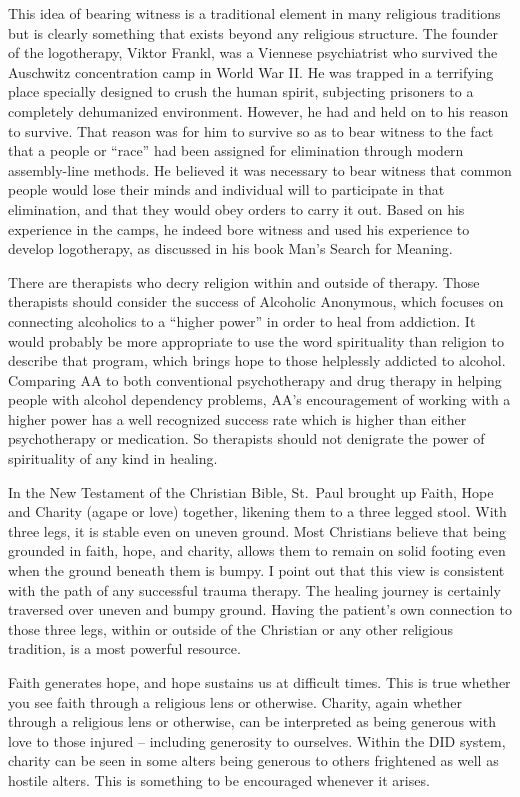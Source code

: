 \documentclass[]{book}
\begin{document}
This idea of bearing witness is a traditional element in many religious traditions but is clearly something that exists beyond any religious structure. The founder of the logotherapy, Viktor Frankl, was a Viennese psychiatrist who survived the Auschwitz concentration camp in World War II. He was trapped in a terrifying place specially designed to crush the human spirit, subjecting prisoners to a completely dehumanized environment. However, he had and held on to his reason to survive. That reason was for him to survive so as to bear witness to the fact that a people or ``race'' had been assigned for elimination through modern assembly-line methods. He believed it was necessary to bear witness that common people would lose their minds and individual will to participate in that elimination, and that they would obey orders to carry it out. Based on his experience in the camps, he indeed bore witness and used his experience to develop logotherapy, as discussed in his book Man's Search for Meaning.

There are therapists who decry religion within and outside of therapy. Those therapists should consider the success of Alcoholic Anonymous, which focuses on connecting alcoholics to a ``higher power'' in order to heal from addiction. It would probably be more appropriate to use the word spirituality than religion to describe that program, which brings hope to those helplessly addicted to alcohol. Comparing AA to both conventional psychotherapy and drug therapy in helping people with alcohol dependency problems, AA's encouragement of working with a higher power has a well recognized success rate which is higher than either psychotherapy or medication. So therapists should not denigrate the power of spirituality of any kind in healing.

In the New Testament of the Christian Bible, St.~Paul brought up Faith, Hope and Charity (agape or love) together, likening them to a three legged stool. With three legs, it is stable even on uneven ground. Most Christians believe that being grounded in faith, hope, and charity, allows them to remain on solid footing even when the ground beneath them is bumpy. I point out that this view is consistent with the path of any successful trauma therapy. The healing journey is certainly traversed over uneven and bumpy ground. Having the patient's own connection to those three legs, within or outside of the Christian or any other religious tradition, is a most powerful resource.

Faith generates hope, and hope sustains us at difficult times. This is true whether you see faith through a religious lens or otherwise. Charity, again whether through a religious lens or otherwise, can be interpreted as being generous with love to those injured -- including generosity to ourselves. Within the DID system, charity can be seen in some alters being generous to others frightened as well as hostile alters. This is something to be encouraged whenever it arises.
\end{document}
